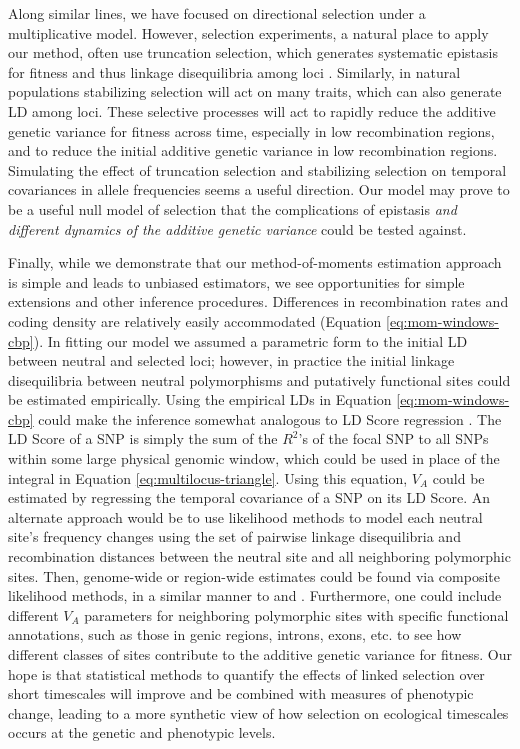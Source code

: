\documentclass[11pt]{article}
\newcommand{\vb}[1]{{\it \color{blue} #1}}
\begin{document}
Along similar lines, we have focused on directional selection under a
multiplicative model. However, selection experiments, a natural place to apply
our method, often use truncation selection, which generates systematic
epistasis for fitness and thus linkage disequilibria among loci
\parencite{Burger2000-an,Walsh2018-bt}. Similarly, in natural populations
stabilizing selection will act on many traits, which can also generate LD among
loci. These selective processes will act to rapidly reduce the additive genetic
variance for fitness across time, especially in low recombination regions, and
to reduce the initial additive genetic variance in low recombination regions.
Simulating the effect of truncation selection and stabilizing selection on
temporal covariances in allele frequencies seems a useful direction. Our model
may prove to be a useful null model of selection that the complications of
epistasis \vb{and different dynamics of the additive genetic variance} could be
tested against. 

Finally, while we demonstrate that our method-of-moments estimation approach is
simple and leads to unbiased estimators, we see opportunities for simple
extensions and other inference procedures. Differences in recombination rates
and coding density are relatively easily accommodated (Equation
\ref{eq:mom-windows-cbp}). In fitting our model we assumed a parametric form to
the initial LD between neutral and selected loci; however, in practice the
initial linkage disequilibria between neutral polymorphisms and putatively
functional sites could be estimated empirically. Using the empirical LDs in
Equation \eqref{eq:mom-windows-cbp} could make the inference somewhat analogous
to LD Score regression \parencite{Bulik-Sullivan2015-ls}. The LD Score of a SNP
is simply the sum of the $R^2$'s of the focal SNP to all SNPs within some large
physical genomic window, which could be used in place of the integral in
Equation \eqref{eq:multilocus-triangle}. Using this equation, $V_A$ could be
estimated by regressing the temporal covariance of a SNP on its LD Score. An
alternate approach would be to use likelihood methods to model each neutral
site's frequency changes using the set of pairwise linkage disequilibria and
recombination distances between the neutral site and all neighboring
polymorphic sites. Then, genome-wide or region-wide estimates could be found
via composite likelihood methods, in a similar manner to
\textcite{McVicker2009-ax} and \textcite{Elyashiv2016-vt}. Furthermore, one
could include different $V_A$ parameters for neighboring polymorphic sites with
specific functional annotations, such as those in genic regions, introns,
exons, etc. to see how different classes of sites contribute to the additive
genetic variance for fitness. Our hope is that statistical methods to quantify
the effects of linked selection over short timescales will improve and be
combined with measures of phenotypic change, leading to a more synthetic view
of how selection on ecological timescales occurs at the genetic and phenotypic
levels.
\end{document}
